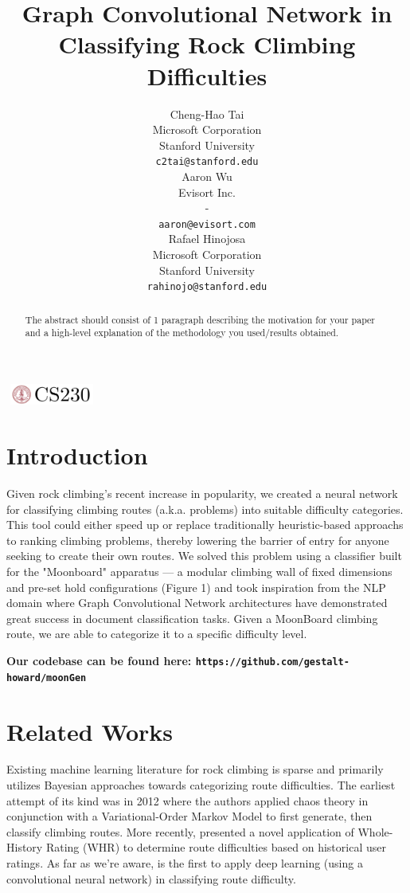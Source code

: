 \documentclass{article}
\title{Graph Convolutional Network in Classifying Rock Climbing Difficulties}
\author{
  Cheng-Hao Tai \\
  Microsoft Corporation \\
  Stanford University \\
  \texttt{c2tai@stanford.edu} \\
  \And
  Aaron Wu \\
  Evisort Inc. \\
  - \\
  \texttt{aaron@evisort.com} \\
  \And
  Rafael Hinojosa \\
  Microsoft Corporation \\
  Stanford University \\
  \texttt{rahinojo@stanford.edu} \\
}
\begin{document}
\begin{center}
\includegraphics[width=3cm, height=0.7cm]{CS230}
\end{center}

\maketitle

\begin{abstract}
The abstract should consist of 1 paragraph describing the motivation for your paper and a high-level explanation of the methodology you used/results obtained.
\end{abstract}

\section{Introduction}	
Given rock climbing's recent increase in popularity, we created a neural network for classifying climbing routes (a.k.a. problems) into suitable difficulty categories. This tool could either speed up or replace traditionally heuristic-based approachs to ranking climbing problems, thereby lowering the barrier of entry for anyone seeking to create their own routes. We solved this problem using a classifier built for the "Moonboard" apparatus --- a modular climbing wall of fixed dimensions and pre-set hold configurations (Figure 1) and took inspiration from the NLP domain where Graph Convolutional Network architectures have demonstrated great success in document classification tasks. Given a MoonBoard climbing route, we are able to categorize it to a specific difficulty level.

{\small\textbf{Our codebase can be found here: \texttt{https://github.com/gestalt-howard/moonGen}}}

\section{Related Works}
Existing machine learning literature for rock climbing is sparse and primarily utilizes Bayesian approaches towards categorizing route difficulties. The earliest attempt of its kind was in 2012 \cite{Phillips_2012} where the authors applied chaos theory in conjunction with a Variational-Order Markov Model to first generate, then classify climbing routes. More recently, \cite{scarff2020estimation} presented a novel application of Whole-History Rating (WHR) \cite{RemiCoulomWHR} to determine route difficulties based on historical user ratings. As far as we're aware, \cite{DoblesCS229} is the first to apply deep learning (using a convolutional neural network) in classifying route difficulty.
\end{document}
